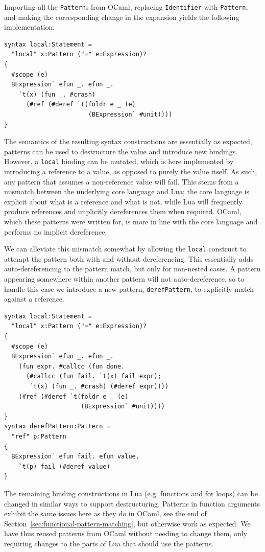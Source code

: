 \documentclass{kththesis}
\begin{document}
Importing all the \texttt{Pattern}s from OCaml, replacing \texttt{Identifier} with \texttt{Pattern}, and making the corresponding change in the expansion yields the following implementation:

\begin{verbatim}
syntax local:Statement =
  "local" x:Pattern ("=" e:Expression)?
{
  #scope (e)
  BExpression` efun _. efun _.
    `t(x) (fun _. #crash)
      (#ref (#deref `t(foldr e _ (e)
                       (BExpression` #unit))))
}
\end{verbatim}

The semantics of the resulting syntax constructions are essentially as expected, patterns can be used to destructure the value and introduce new bindings. However, a \texttt{local} binding can be mutated, which is here implemented by introducing a reference to a value, as opposed to purely the value itself. As such, any pattern that assumes a non-reference value will fail. This stems from a mismatch between the underlying core language and Lua; the core language is explicit about what is a reference and what is not, while Lua will frequently produce references and implicitly dereferences them when required. OCaml, which these patterns were written for, is more in line with the core language and performs no implicit dereference.

We can alleviate this mismatch somewhat by allowing the \texttt{local} construct to attempt the pattern both with and without dereferencing. This essentially adds auto-dereferencing to the pattern match, but only for non-nested cases. A pattern appearing somewhere within another pattern will not auto-dereference, so to handle this case we introduce a new pattern, \texttt{derefPattern}, to explicitly match against a reference.

\begin{verbatim}
syntax local:Statement =
  "local" x:Pattern ("=" e:Expression)?
{
  #scope (e)
  BExpression` efun _. efun _.
    (fun expr. #callcc (fun done.
      (#callcc (fun fail. `t(x) fail expr);
       `t(x) (fun _. #crash) (#deref expr))))
    (#ref (#deref `t(foldr e _ (e)
                     (BExpression` #unit))))
}
syntax derefPattern:Pattern =
  "ref" p:Pattern
{
  BExpression` efun fail. efun value.
    `t(p) fail (#deref value)
}
\end{verbatim}

The remaining binding constructions in Lua (e.g. functions and for loops) can be changed in similar ways to support destructuring. Patterns in function arguments exhibit the same issues here as they do in OCaml, see the end of Section~\ref{sec:functional-pattern-matching}, but otherwise work as expected. We have thus reused patterns from OCaml without needing to change them, only requiring changes to the parts of Lua that should use the patterns.
\end{document}
